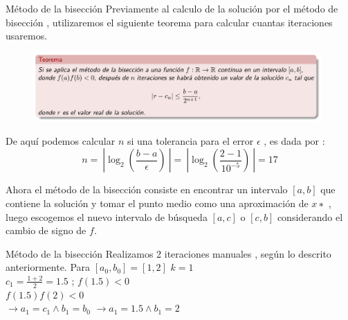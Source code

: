 \begin{frame}{Método de la bisección}
Previamente al calculo de la solución por el método de bisección , utilizaremos el siguiente teorema para calcular cuantas iteraciones usaremos.
        \begin{figure}
			\includegraphics[width=11cm]{p10-teorema2.png}
		\end{figure}
De aquí podemos calcular \(n\) si una tolerancia para el error \( \epsilon \) , es dada por :
\begin{equation*}
    n = \ | \log_2 (\frac{b-a}{\epsilon}) \ | = \ | \log_2 (\frac{2-1}{10^{-5}}) \ | = 17
\end{equation*}

Ahora el método de la bisección consiste en encontrar un intervalo \( [a, b] \) que contiene la solución y
tomar el punto medio como una aproximación de \( x∗ \) , luego escogemos el nuevo intervalo de
búsqueda \( [a, c] \) o \( [c, b] \) considerando el cambio de signo de \( f \).
\end{frame}

\begin{frame}{Método de la bisección }
         Realizamos 2 iteraciones manuales , según lo descrito anteriormente.
         Para \( [a_0 , b_0 ] = [1 , 2]\)
             \( k = 1 \) \\
             \(c_1 = \frac{1+2}{2} = 1.5 \) ; \(f(1.5)<0 \) \\
             \(f(1.5)f(2) <0\) \\ \(\xrightarrow{} a_1 = c_1 \land b_1 = b_0  \)
             \( \xrightarrow{} a_1 = 1.5 \land b_1 = 2\)
\end{frame}


